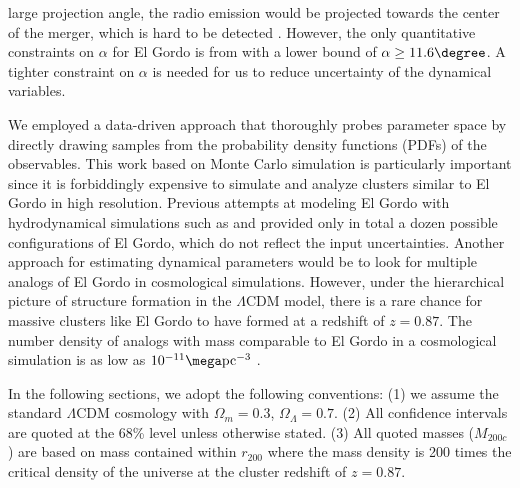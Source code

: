 large projection angle, the radio emission would be projected towards the
center of the merger, which is hard to be detected \citep{Vazza11}.
However, the only quantitative constraints on $\alpha$ for El Gordo is from
\cite{L13} with a lower bound of $\alpha \geq 11.6 \degree$. A tighter
constraint on $\alpha$ is needed for us to reduce uncertainty of the
dynamical variables. 
\par 
We employed a data-driven approach that thoroughly probes parameter
space by directly drawing samples from the probability density functions
(PDFs) of
the observables. 
This work based on Monte Carlo simulation is particularly important since
it is forbiddingly expensive to simulate and analyze clusters similar to El
Gordo in high resolution. Previous attempts at modeling El Gordo with hydrodynamical
simulations such as \cite{Donnert13} and \cite{Molnar14} provided only in
total a dozen possible configurations of El Gordo, which do not
reflect the input uncertainties. Another approach for
estimating dynamical parameters would be to look for multiple analogs of El Gordo in cosmological
simulations.  However, under the hierarchical picture
of structure formation in the $\Lambda$CDM model, there is a rare chance
for massive clusters like El Gordo to have formed at a redshift of $z = 0.87$.  
The number density of analogs with mass comparable to El Gordo in a
cosmological simulation is as low as $10^{-11} \mega\text{pc}^{-3}$ .  
\par
In the following sections, we adopt the following conventions: (1) we
assume the standard $\Lambda$CDM cosmology with $\Omega_{m} = 0.3$, $\Omega_{\Lambda} = 0.7$. (2) All confidence intervals are quoted at the 68\% level unless otherwise stated. 
(3) All quoted masses ($M_{200c}$) are based on mass contained
within $r_{200}$ where the mass density is 200 times the critical density
of the universe at the cluster redshift of $z = 0.87$. 
